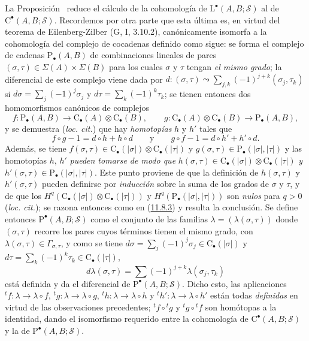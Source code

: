 \begin{env}[11.8.6]
\label{0.11.8.6}
\label{0.11.8.6-fr}
La Proposición~ reduce el cálculo de la cohomología de
$\mathrm L^\bullet(A,B;\mathscr S)$ al de
$\mathrm C^\bullet(A,B;\mathscr S)$. Recordemos por otra parte que esta última es, en virtud del teorema de Eilenberg-Zilber (G, I, 3.10.2), canónicamente isomorfa a la cohomología del complejo de cocadenas definido como sigue: se forma el complejo de cadenas $\mathrm P_\bullet(A,B)$ de combinaciones lineales de pares
$(\sigma,\tau)\in\Sigma(A)\times\Sigma(B)$ para los cuales $\sigma$ y
$\tau$ tengan \emph{el mismo grado}; la diferencial de este complejo
viene dada por
$d:(\sigma,\tau)\leadsto\sum_{j,k}(-1)^{j+k}(\sigma_j,\tau_k)$ si
$d\sigma=\sum_j(-1)^j\sigma_j$ y $d\tau=\sum_k(-1)^k\tau_k$;
se tienen entonces dos homomorfismos canónicos de complejos
\[
f:\mathrm P_\bullet(A,B)\longrightarrow
\mathrm C_\bullet(A)\otimes\mathrm C_\bullet(B),\qquad
g:\mathrm C_\bullet(A)\otimes\mathrm C_\bullet(B)
\longrightarrow\mathrm P_\bullet(A,B),
\] y se demuestra (\emph{loc. cit.}) que hay \emph{homotopías} $h$ y $h'$ tales que
\[
f\circ g-1=d\circ h+h\circ d\qquad\text{y}\qquad
g\circ f-1=d\circ h'+h'\circ d.
\]
Además, se tiene $f(\sigma,\tau)\in\mathrm C_\bullet(|\sigma|)
\otimes\mathrm C_\bullet(|\tau|)$ y $g(\sigma,\tau)\in\mathrm P_\bullet(|\sigma|,|\tau|)$ y las homotopías $h$, $h'$ \emph{pueden tomarse de modo que} $h(\sigma,\tau)\in\mathrm C_\bullet(|\sigma|)
\otimes\mathrm C_\bullet(|\tau|)$ \emph{y} $h'(\sigma,\tau)\in\mathrm P_\bullet(|\sigma|,|\tau|)$. Este punto proviene de que la definición de $h(\sigma,\tau)$ y $h'(\sigma,\tau)$ pueden definirse por
\emph{inducción} sobre la suma de los grados de $\sigma$ y $\tau$, y de que los
$H^q(\mathrm C_\bullet(|\sigma|)\otimes\mathrm C_\bullet(|\tau|))$ y
$H^q(\mathrm P_\bullet(|\sigma|,|\tau|))$
son \emph{nulos} para $q>0$ (\emph{loc. cit.}); se razona entonces como en (\hyperref[0.11.8.3-fr]{11.8.3}) y resulta la conclusión. Se define entonces $\mathrm P^\bullet(A,B;\mathscr S)$ como el conjunto de las familias $\lambda=(\lambda(\sigma,\tau))$ donde $(\sigma,\tau)$ recorre los pares cuyos términos tienen el mismo grado, con $\lambda(\sigma,\tau)\in\Gamma_{\sigma,\tau}$, y como se tiene $d\sigma=\sum_j(-1)^j\sigma_j\in\mathrm C_\bullet(|\sigma|)$ y $d\tau=\sum_k(-1)^k\tau_k\in\mathrm C_\bullet(|\tau|)$,
\[
d\lambda(\sigma,\tau)=
\sum(-1)^{j+k}\lambda(\sigma_j,\tau_k)
\]
está definida y da el diferencial de
$\mathrm P^\bullet(A,B;\mathscr S)$. Dicho esto, las aplicaciones ${}^tf:\lambda\to\lambda\circ f$, ${}^tg:\lambda\to\lambda\circ g$, ${}^th:\lambda\to\lambda\circ h$ y ${}^th':\lambda\to\lambda\circ h'$ están todas \emph{definidas} en virtud de las observaciones precedentes;
${}^tf\circ{}^tg$ y ${}^tg\circ{}^tf$ son homótopas a la
identidad, dando el isomorfismo requerido entre la cohomología de
$\mathrm C^\bullet(A,B;\mathscr S)$ y la de
$\mathrm P^\bullet(A,B;\mathscr S)$.
\end{env}

